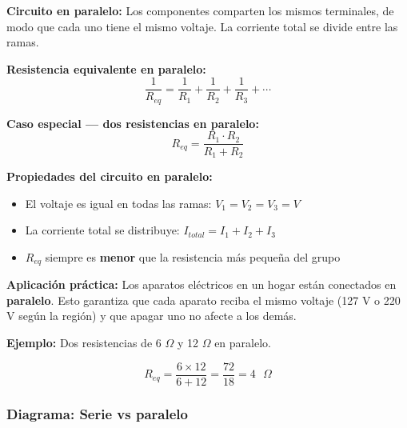 \begin{seccion}
\begin{definicion}
\textbf{Circuito en paralelo:} Los componentes comparten los mismos terminales, de modo que cada uno tiene el mismo voltaje. La corriente total se divide entre las ramas.
\end{definicion}

\begin{ecuacion}
\textbf{Resistencia equivalente en paralelo:}
$$\frac{1}{R_{eq}} = \frac{1}{R_1} + \frac{1}{R_2} + \frac{1}{R_3} + \cdots$$

\textbf{Caso especial — dos resistencias en paralelo:}
$$R_{eq} = \frac{R_1 \cdot R_2}{R_1 + R_2}$$

\textbf{Propiedades del circuito en paralelo:}
\begin{itemize}
    \item El voltaje es igual en todas las ramas: $V_1 = V_2 = V_3 = V$
    \item La corriente total se distribuye: $I_{total} = I_1 + I_2 + I_3$
    \item $R_{eq}$ siempre es \textbf{menor} que la resistencia más pequeña del grupo
\end{itemize}
\end{ecuacion}

\begin{nota}
\textbf{Aplicación práctica:} Los aparatos eléctricos en un hogar están conectados en \textbf{paralelo}. Esto garantiza que cada aparato reciba el mismo voltaje (127 V o 220 V según la región) y que apagar uno no afecte a los demás.
\end{nota}

\textbf{Ejemplo:} Dos resistencias de 6 $\Omega$ y 12 $\Omega$ en paralelo.

$$R_{eq} = \frac{6 \times 12}{6 + 12} = \frac{72}{18} = 4 \text{ }\Omega$$
\end{seccion}

\subsubsection{Diagrama: Serie vs paralelo}

